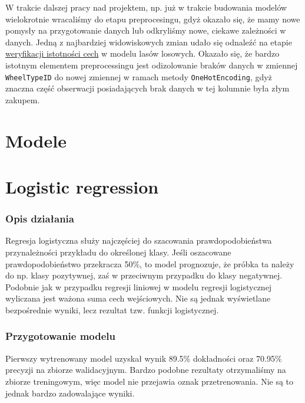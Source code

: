 \documentclass[11pt]{article}
\begin{document}
W trakcie dalszej pracy nad projektem, np. już w trakcie budowania
modelów wielokrotnie wracaliśmy do etapu preprocesingu, gdyż okazało
się, że mamy nowe pomysły na przygotowanie danych lub odkryliśmy nowe,
ciekawe zależności w danych. Jedną z najbardziej widowiskowych zmian
udało się odnaleźć na etapie
\hyperref[ocena-predykcyjności-cech]{weryfikacji istotności cech} w
modelu lasów losowych. Okazało się, że bardzo istotnym elementem
preprocessingu jest odizolowanie braków danych w zmiennej
\texttt{WheelTypeID} do nowej zmiennej w ramach metody
\texttt{OneHotEncoding}, gdyż znaczna część obserwacji posiadających
brak danych w tej kolumnie była złym zakupem.

    \hypertarget{modele}{%
\section{Modele}\label{modele}}

    \hypertarget{logistic-regression}{%
\section{Logistic regression}\label{logistic-regression}}

\hypertarget{opis-dziaux142ania}{%
\subsubsection{Opis działania}\label{opis-dziaux142ania}}

Regresja logistyczna służy najczęściej do szacowania prawdopodobieństwa
przynależności przykładu do określonej klasy. Jeśli oszacowane
prawdopodobieństwo przekracza 50\%, to model prognozuje, że próbka ta
należy do np. klasy pozytywnej, zaś w przeciwnym przypadku do klasy
negatywnej. Podobnie jak w przypadku regresji liniowej w modelu regresji
logistycznej wyliczana jest ważona suma cech wejściowych. Nie są jednak
wyświetlane bezpośrednie wyniki, lecz rezultat tzw. funkcji
logistycznej.

\hypertarget{przygotowanie-modelu}{%
\subsubsection{Przygotowanie modelu}\label{przygotowanie-modelu}}

Pierwszy wytrenowany model uzyskał wynik 89.5\% dokładności oraz 70.95\%
precyzji na zbiorze walidacyjnym. Bardzo podobne rezultaty otrzymaliśmy
na zbiorze treningowym, więc model nie przejawia oznak przetrenowania.
Nie są to jednak bardzo zadowalające wyniki.
\end{document}
